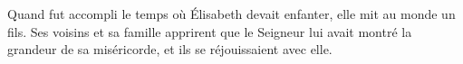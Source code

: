Quand fut accompli le temps où Élisabeth devait enfanter,
	elle mit au monde un fils.
Ses voisins et sa famille apprirent
		que le Seigneur lui avait montré la grandeur de sa miséricorde,
	et ils se réjouissaient avec elle.

